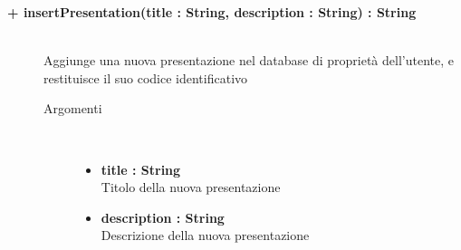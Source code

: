 \begin{description}
	\begin{description}
		\item[\textbf{\color{blue}+ insertPresentation(title : String, description : String) : String			}] \hfill \\
			Aggiunge una nuova presentazione nel database di proprietà dell'utente, e restituisce il suo codice identificativo
			
		\begin{description}
			\item[Argomenti] \hfill \\
				\begin{itemize}
				
					\item \textbf{title : String			} \hfill \\
					Titolo della nuova presentazione
					\item \textbf{description : String			} \hfill \\
					Descrizione della nuova presentazione
					

\end{itemize}
\end{description}
\end{description}
\end{description}
